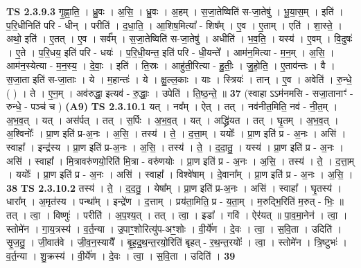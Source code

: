 \documentclass[17pt]{extarticle}
\begin{document}
                  \newline
                                \textbf{ TS 2.3.9.3} \newline
                  गृ॒ह्णा॒ति॒ । ध्रु॒वः । अ॒सि॒ । ध्रु॒वः । अ॒हम् । स॒जा॒तेष्विति॑ स-जा॒तेषु॑ । भू॒या॒स॒म् । इति॑ । प॒रि॒धीनिति॑ परि - धीन् । परीति॑ । द॒धा॒ति॒ । आ॒शिष॒मित्या᳚ - शिष᳚म् । ए॒व । ए॒ताम् । एति॑ । शा॒स्ते॒ । अथो॒ इति॑ । ए॒तत् । ए॒व । सर्व᳚म् । स॒जा॒तेष्विति॑ स-जा॒तेषु॑ । अधीति॑ । भ॒व॒ति॒ । यस्य॑ । ए॒वम् । वि॒दुषः॑ । ए॒ते । प॒रि॒धय॒ इति॑ परि - धयः॑ । प॒रि॒धी॒यन्त॒ इति॑ परि - धी॒यन्ते᳚ । आम॑न॒मित्या - म॒न॒म् । अ॒सि॒ । आम॑न॒स्येत्या - म॒न॒स्य॒ । दे॒वाः॒ । इति॑ । ति॒स्रः । आहु॑ती॒रित्या - हु॒तीः॒ । जु॒हो॒ति॒ । ए॒ताव॑न्तः । वै । स॒जा॒ता इति॑ स-जा॒ताः । ये । म॒हान्तः॑ । ये । क्षु॒ल्ल॒काः । याः । स्त्रियः॑ । तान् ।  ए॒व । अवेति॑ । रु॒न्धे॒ ( ) । ते । ए॒न॒म् । अव॑रुद्धा॒ इत्यव॑ - रु॒द्धाः॒ । उपेति॑ । ति॒ष्ठ॒न्ते॒ ॥ \textbf{  37} \newline
                  \newline
                      (स्वाहा ऽऽम॑नमसि - सजा॒तानाꣳ॑ - रुन्धे॒ - पञ्च॑ च )  \textbf{(A9)} \newline \newline
                                \textbf{ TS 2.3.10.1} \newline
                  यत् । नव᳚म् । ऐत् । तत् । नव॑नीत॒मिति॒ नव॑ - नी॒त॒म् । अ॒भ॒व॒त् । यत् । अस॑र्पत् । तत् । स॒र्पिः । अ॒भ॒व॒त् । यत् । अद्ध्रि॑यत । तत् । घृ॒तम् । अ॒भ॒व॒त् । अ॒श्विनोः᳚ । प्रा॒ण इति॑ प्र-अ॒नः । अ॒सि॒ । तस्य॑ । ते॒ । द॒त्ता॒म् । ययोः᳚ । प्रा॒ण इति॑ प्र - अ॒नः । असि॑ । स्वाहा᳚ । इन्द्र॑स्य । प्रा॒ण इति॑ प्र-अ॒नः । अ॒सि॒ । तस्य॑ । ते॒ । द॒दा॒तु॒ । यस्य॑ । प्रा॒ण इति॑ प्र - अ॒नः । असि॑ । स्वाहा᳚ । मि॒त्रावरु॑णयो॒रिति॑ मि॒त्रा - वरु॑णयोः । प्रा॒ण इति॑ प्र - अ॒नः । अ॒सि॒ । तस्य॑ । ते॒ । द॒त्ता॒म् । ययोः᳚ । प्रा॒ण इति॑ प्र - अ॒नः । असि॑ । स्वाहा᳚ । विश्वे॑षाम् । दे॒वाना᳚म् । प्रा॒ण इति॑ प्र - अ॒नः । अ॒सि॒ । \textbf{  38} \newline
                  \newline
                                \textbf{ TS 2.3.10.2} \newline
                  तस्य॑ । ते॒ । द॒द॒तु॒ । येषा᳚म् । प्रा॒ण इति॑ प्र-अ॒नः । असि॑ । स्वाहा᳚ । घृ॒तस्य॑ । धारा᳚म् । अ॒मृत॑स्य । पन्था᳚म् । इन्द्रे॑ण । द॒त्ताम् । प्रय॑ता॒मिति॒ प्र - य॒ता॒म् । म॒रुद्भि॒रिति॑ म॒रुत् - भिः॒ ॥ तत् । त्वा॒ । विष्णुः॑ । परीति॑ । अ॒प॒श्य॒त् । तत् । त्वा॒ । इडा᳚ । गवि॑ । ऐर॑यत् ॥ पा॒व॒मा॒नेन॑ । त्वा॒ । स्तोमे॑न । गा॒य॒त्रस्य॑ । व॒र्त॒न्या । उ॒पाꣳ॒॒शोरित्यु॑प-अꣳ॒॒शोः । वी॒र्ये॑ण । दे॒वः । त्वा॒ । स॒वि॒ता । उदिति॑ । सृ॒ज॒तु॒ । जी॒वात॑वे । जी॒व॒न॒स्यायै᳚ । बृ॒ह॒द्र॒थ॒न्त॒रयो॒रिति॑ बृहत् - र॒थ॒न्त॒रयोः᳚ । त्वा॒ । स्तोमे॑न । त्रि॒ष्टुभः॑ । व॒र्त॒न्या । शु॒क्रस्य॑ । वी॒र्ये॑ण । दे॒वः । त्वा॒ । स॒वि॒ता । उदिति॑ । \textbf{  39} \newline
\end{document}
